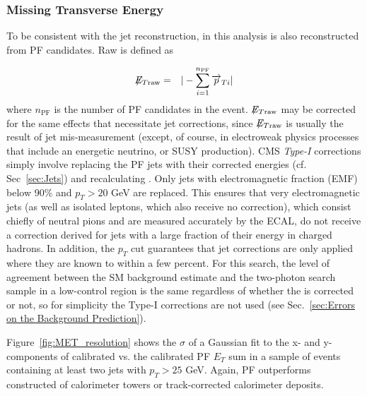 \documentclass[dissertation.tex]{subfiles}
\begin{document}
\subsubsection{Missing Transverse Energy}
\label{sec:MET}

To be consistent with the jet reconstruction, \MET in this analysis is also reconstructed from PF candidates.  Raw \MET is defined as

\begin{eqnarray}
\not\!\! E_{T\mathrm{raw}} &=& |-\sum_{i = 1}^{n_{\mathrm{PF}}}\overrightarrow{p}_{Ti}|
\end{eqnarray}
%
where $n_{\mathrm{PF}}$ is the number of PF candidates in the event.  $\not\!\! E_{T\mathrm{raw}}$ may be corrected for the same effects that necessitate jet corrections, since $\not\!\! E_{T\mathrm{raw}}$ is usually the result of jet mis-measurement (except, of course, in electroweak physics processes that include an energetic neutrino, or SUSY production).  CMS \textit{Type-I} \MET corrections simply involve replacing the PF jets with their corrected energies (cf. Sec~\ref{sec:Jets}) and recalculating \MET.  Only jets with electromagnetic fraction (EMF) below 90\% and $p_{T} > 20$ GeV are replaced.  This ensures that very electromagnetic jets (as well as isolated leptons, which also receive no correction), which consist chiefly of neutral pions and are measured accurately by the ECAL, do not receive a correction derived for jets with a large fraction of their energy in charged hadrons.  In addition, the $p_{T}$ cut guarantees that jet corrections are only applied where they are known to within a few percent.  For this search, the level of agreement between the SM background estimate and the two-photon search sample in a low-\MET control region is the same regardless of whether the \MET is corrected or not, so for simplicity the Type-I \MET corrections are not used (see Sec.~\ref{sec:Errors on the Background Prediction}).

Figure~\ref{fig:MET_resolution} shows the $\sigma$ of a Gaussian fit to the x- and y-components of calibrated \MET vs. the calibrated PF $E_{T}$ sum in a sample of events containing at least two jets with $p_{T} > 25$ GeV.  Again, PF \MET outperforms \MET constructed of calorimeter towers or track-corrected calorimeter deposits.
\end{document}
